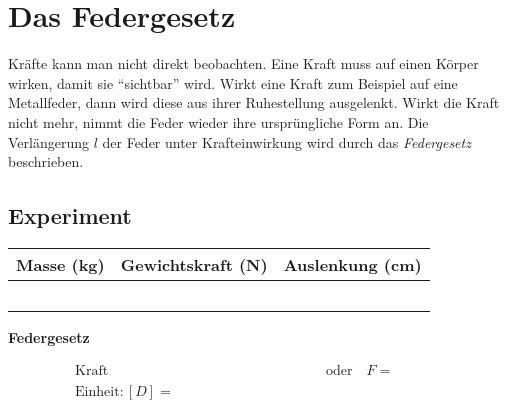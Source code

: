 
\section*{Das Federgesetz}
Kräfte kann man nicht direkt beobachten. Eine Kraft muss auf einen Körper wirken, damit sie ``sichtbar'' wird.
Wirkt eine Kraft zum Beispiel auf eine Metallfeder, dann wird diese aus ihrer Ruhestellung ausgelenkt.
Wirkt die Kraft nicht mehr, nimmt die Feder wieder ihre ursprüngliche Form an. Die Verlängerung $l$ der Feder
unter Krafteinwirkung wird durch das \emph{Federgesetz} beschrieben.


\newcommand\leereZ{\phantom{x} & \phantom{x} & \phantom{x} \\\hline}

\subsection*{Experiment}
\begin{center}
	\begin{tabular}{p{}|p{}|p{}}
    Masse (kg) & Gewichtskraft (N) & Auslenkung (cm) \\\hline
	\leereZ
	\leereZ
	\leereZ
	\leereZ
	\leereZ
	\end{tabular}
\end{center}

\begin{center}
\end{center}

\newpage
\begin{cbox}
	\begin{center}
		\bf{Federgesetz}
	\end{center}
\begin{gather*}
	\text{Kraft} \phantom{=\text{Federkonstante}\cdot\text{Verlängerung}}\quad\text{oder}\quad F=\phantom{-D\cdot\Delta x}\\
	\text{Einheit}: [D] = \phantom{\frac{\text{Newton}}{\text{Meter}}=\frac{\si{N}}{\si{m}}}
\end{gather*}
\end{cbox}



